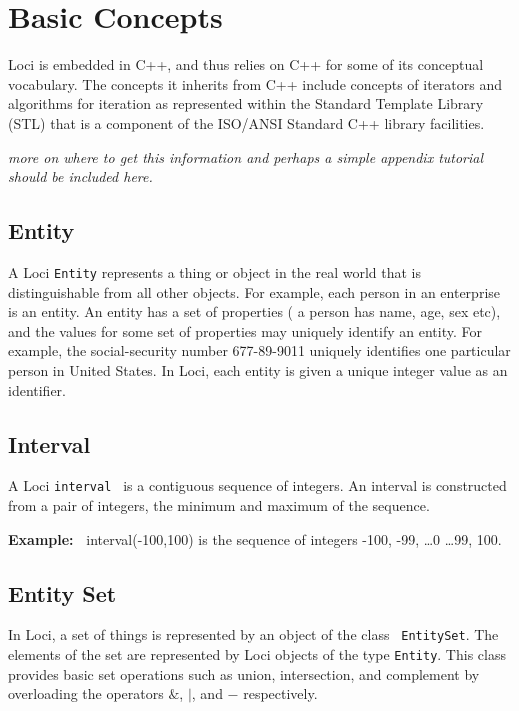 \chapter{ Basic Concepts }

Loci is embedded in C++, and thus relies on C++ for some of its
conceptual vocabulary.  The concepts it inherits from C++ include
concepts of iterators and algorithms for iteration as represented
within the Standard Template Library (STL) that is a component of the
ISO/ANSI Standard C++ library facilities.  

{\it more on where to get this information and perhaps a simple
  appendix tutorial should be included here.}


\section{Entity}
A Loci {\tt Entity} represents a thing or object in the real world
that is distinguishable from all other objects. For example, each
person in an enterprise is an entity. An entity has a set of
properties ( a person has name, age, sex etc), and the values for some
set of properties may uniquely identify an entity. For example, the
social-security number 677-89-9011 uniquely identifies one particular
person in United States. In Loci, each entity is given a unique
integer value as an identifier.
%

\section {Interval}
A Loci {\tt interval } is a contiguous sequence of integers.  An
 interval is constructed from a pair of integers, the minimum and
 maximum of the sequence.

\par {\bf Example:~ } interval(-100,100) is the sequence of integers -100, -99, \dots 0 \dots 99, 100.

%
\section{Entity Set} 

In Loci, a set of things is represented by an object of the class {\tt
  EntitySet}.  The elements of the set are represented by Loci objects
of the type {\tt Entity}.  This class provides basic set operations
such as union, intersection, and complement by overloading the
operators ${\&}$, ${|}$, and ${-}$ respectively.  

